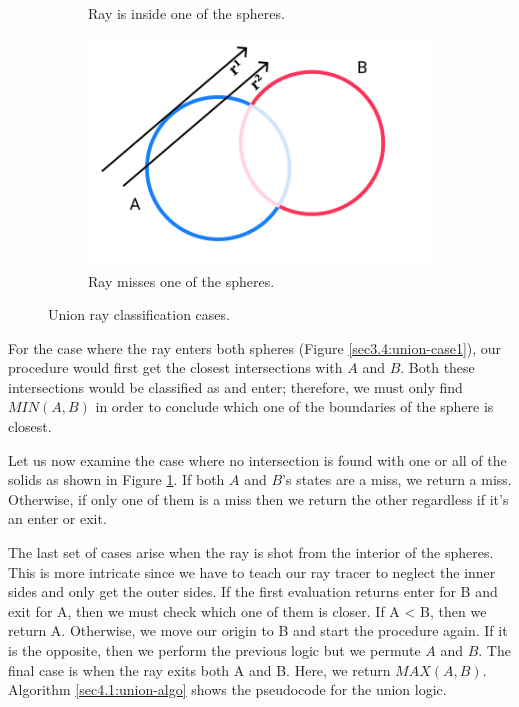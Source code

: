 \documentclass[a4paper,11pt,oneside]{article}
\begin{document}
\begin{figure}[ht]
\begin{subfigure}[b]{0.3\textwidth}
		\caption{Ray is inside one of the spheres.}
		\label{sec3.4:union-case2}
	\end{subfigure}
	\hfill
	\begin{subfigure}[b]{0.3\textwidth}
		\centering
		\includegraphics[width=\textwidth]{section4/4.1/union-case-3.png}
		\caption{Ray misses one of the spheres.}
		\label{sec3.4:union-case3}
	\end{subfigure}
	\caption{Union ray classification cases.}
	\label{sec3.4:sphere-union}
\end{figure}

For the case where the ray enters both spheres (Figure \ref{sec3.4:union-case1}), our procedure would first get the closest intersections with $A$ and $B$. Both these intersections would be classified as and enter; therefore, we must only find $MIN(A, B)$ in order to conclude which one of the boundaries of the sphere is closest.

Let us now examine the case where no intersection is found with one or all of the solids as shown in Figure \ref{sec3.4:union-case2}. If both $A$ and $B$'s states are a miss, we return a miss. Otherwise, if only one of them is a miss then we return the other regardless if it's an enter or exit.

The last set of cases arise when the ray is shot from the interior of the spheres. This is more intricate since we have to teach our ray tracer to neglect the inner sides and only get the outer sides. If the first evaluation returns enter for B and exit for A, then we must check which one of them is closer. If A < B, then we return A. Otherwise, we move our origin to B and start the procedure again. If it is the opposite, then we perform the previous logic but we permute $A$ and $B$. The final case is when the ray exits both A and B. Here, we return $MAX(A, B)$. Algorithm \ref{sec4.1:union-algo} shows the pseudocode for the union logic.
\end{document}
